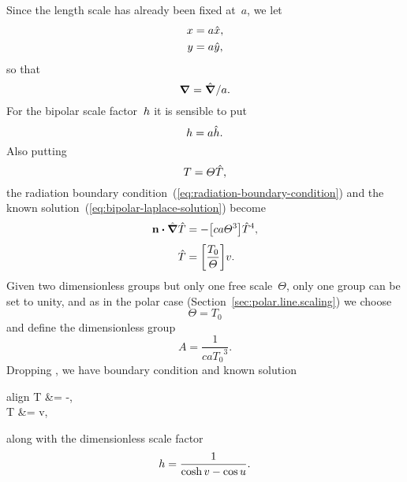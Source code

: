 Since the length scale has already been fixed at~$a$,
we let
\begin{align}
  x &= a \hat{x}, \label{eq:bipolar-x-scaling} \\
  y &= a \hat{y}, \label{eq:bipolar-y-scaling}
\end{align}
so that
\begin{equation}
  \mathop{}\!\boldsymbol{\mathbf{\nabla}} = \mathop{}\!\hat{\mathop{}\!\boldsymbol{\mathbf{\nabla}}} / a.
  \label{eq:bipolar-del-scaling}
\end{equation}
For the bipolar scale factor~$\scalefac$ it is sensible to put
\begin{equation}
  \scalefac = a \scaled{\scalefac}.
  \label{eq:bipolar-scale-factor-scaling}
\end{equation}
Also putting
\begin{equation}
  T = \varTheta \hat{T},
  \label{eq:bipolar-temperature-scaling}
\end{equation}
the radiation boundary condition~(\ref{eq:radiation-boundary-condition})
and the known solution~(\ref{eq:bipolar-laplace-solution})
become
\begin{align}
  \normalvec \dotp \scaleddel \scaled{T}
    &= -\group{c a \Theta^3} \scaled{T}^4,
    \label{eq:bipolar-scaled-radiation-boundary-condition-with-groups}
    \\[\tallspace]
  \scaled{T} &= \group{\frac{T_0}{\Theta}} v.
    \label{eq:bipolar-scaled-laplace-solution-with-groups}
\end{align}
Given two dimensionless groups but only one free scale~$\Theta$,
only one group can be set to unity,
and as in the polar case (Section~\ref{sec:polar.line.scaling})
we choose
\begin{equation}
  \Theta = T_0
    \label{eq:bipolar-temperature-scale}
\end{equation}
and define the dimensionless group
\begin{equation}
  A = \frac{1}{c a {T_0}^3}.
  \label{eq:bipolar-dimensionless-group}
\end{equation}
Dropping \scalingmarks,
we have boundary condition and known solution
\begin{important}{align}
  \normalvec \dotp \del T &= -,
    \label{eq:bipolar-scaled-radiation-boundary-condition} \\
  T &= v,
    \label{eq:bipolar-scaled-laplace-solution}
\end{important}
along with the dimensionless scale factor
\begin{equation}
  \scalefac = \frac{1}{\cosh v - \cos u}.
  \label{eq:dimensionless-scale-factor-bipolar}
\end{equation}

